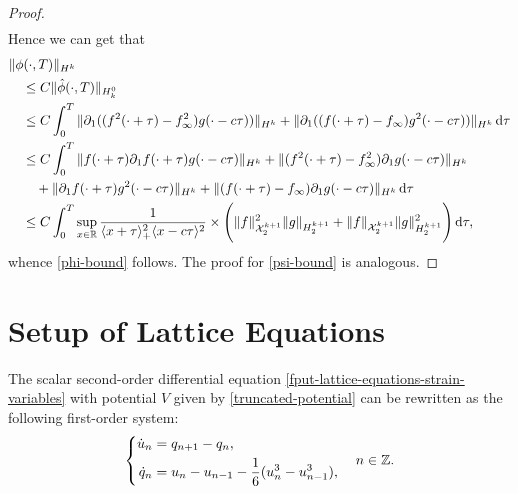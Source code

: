 \begin{proof}
\begin{equation}
\begin{aligned}
	\end{aligned}
	\end{equation}
	Hence we can get that 
	\begin{equation}\label{phi-sobolev-bound}
	\begin{aligned}
		&\|\phi(\cdot, T) \|_{H^k} \\
		&\quad\leq C \| \hat\phi(\cdot, T) \|_{H^0_k} \\
		&\quad\leq C \int_0^T \| \partial_1 ((f^2(\cdot+\tau)-f_\infty^2)g(\cdot-c\tau)) \|_{H^k} + \| \partial_1( (f(\cdot+\tau)-f_\infty)g^2(\cdot-c\tau)) \|_{H^k} \, \mathrm d \tau \\
		&\quad\leq C \int_0^T \| f(\cdot+\tau)\partial_1 f(\cdot + \tau)g(\cdot-c\tau) \|_{H^k} + \|(f^2(\cdot+\tau) -f_\infty^2) \partial_1 g(\cdot - c\tau) \|_{H^k}  \\
		&\qquad + \|\partial_1f(\cdot+\tau) g^2(\cdot - c\tau) \|_{H^k} + \| (f(\cdot + \tau) -f_\infty) \partial_1 g(\cdot - c\tau) \|_{H^k}\, \mathrm{d}\tau \\ 
		&\quad\leq C \int_0^T \sup_{x\in\mathbb{R}} \frac 1 {\langle x + \tau\rangle_+^2 \langle x - c\tau\rangle^2} \times \Bigg( \|f\|^2_{\mathcal X^{k+1}_{2}} \| g \|_{H^{k+1}_2} + \|f\|_{\mathcal X^{k+1}_{2}} \| g \|^2_{H^{k+1}_2} \Bigg) \, \mathrm d \tau, 
	\end{aligned}
	\end{equation}
	whence \cref{phi-bound} follows. The proof for \cref{psi-bound} is analogous.
\end{proof}

\section{Setup of Lattice Equations}

The scalar second-order differential equation \cref{fput-lattice-equations-strain-variables} with potential \(V\) given by \cref{truncated-potential} can be rewritten as the following first-order system:
\begin{equation}\label{first-order-lattice-eqns}
	\left\{\begin{aligned}\dot u _n &= q_{n+1} - q_n, \\
	\dot q_n &= u_n - u_{n-1} - \frac{1} 6 ( u_n^3 - u^3_{n-1}),\end{aligned} \right. \quad n \in \mathbb{Z}.
\end{equation}

